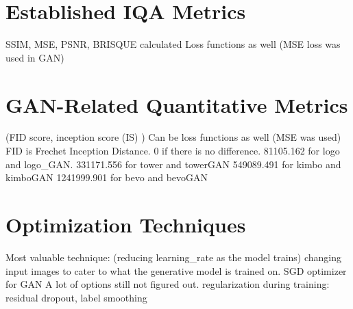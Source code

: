\section{Established IQA Metrics}

SSIM, MSE, PSNR, BRISQUE calculated
Loss functions as well (MSE loss was used in GAN)


\section{GAN-Related Quantitative Metrics}


(FID score, inception score (IS) )
Can be loss functions as well (MSE was used)
FID is Frechet Inception Distance. 0 if there is no difference.
81105.162 for logo and logo\_GAN.
331171.556 for tower and towerGAN
549089.491 for kimbo and kimboGAN
1241999.901 for bevo and bevoGAN

\section{Optimization Techniques}

Most valuable technique:
(reducing learning\_rate as the model trains)
changing input images to cater to what the generative model is trained on.
SGD optimizer for GAN
A lot of options still not figured out.
regularization during training: residual dropout, label smoothing